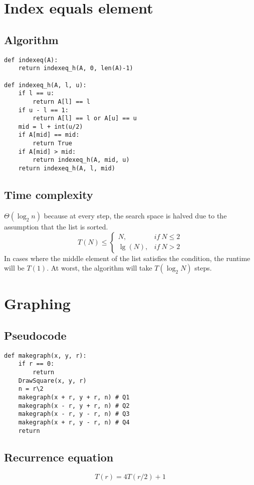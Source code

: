 \documentclass[a4paper,12pt]{article}
\begin{document}
\section{Index equals element}
\subsection{Algorithm}
\begin{lstlisting}
def indexeq(A):
    return indexeq_h(A, 0, len(A)-1)

def indexeq_h(A, l, u):
    if l == u:
        return A[l] == l
    if u - l == 1:
        return A[l] == l or A[u] == u
    mid = l + int(u/2)
    if A[mid] == mid:
        return True
    if A[mid] > mid:
        return indexeq_h(A, mid, u)
    return indexeq_h(A, l, mid)
\end{lstlisting}

\subsection{Time complexity}
$\Theta (\log_{2} n)$ because at every step, the search space is halved due to
the assumption that the list is sorted.
\begin{equation}
T(N) \le \begin{cases}
  N, & if\ N \le 2\\
  \lg(N), & if\ N > 2
\end{cases}
\end{equation}
In cases where the middle element of the list satisfies the condition, the runtime will be $T(1)$.
At worst, the algorithm will take $T(\log_{2}{N})$ steps.


\section{Graphing}
\subsection{Pseudocode}
\begin{lstlisting}
def makegraph(x, y, r):
    if r == 0:
        return
    DrawSquare(x, y, r)
    n = r\2
    makegraph(x + r, y + r, n) # Q1
    makegraph(x - r, y + r, n) # Q2
    makegraph(x - r, y - r, n) # Q3
    makegraph(x + r, y - r, n) # Q4
    return
\end{lstlisting}

\subsection{Recurrence equation}
$$T(r) = 4 T(r/2) + 1$$
\end{document}
